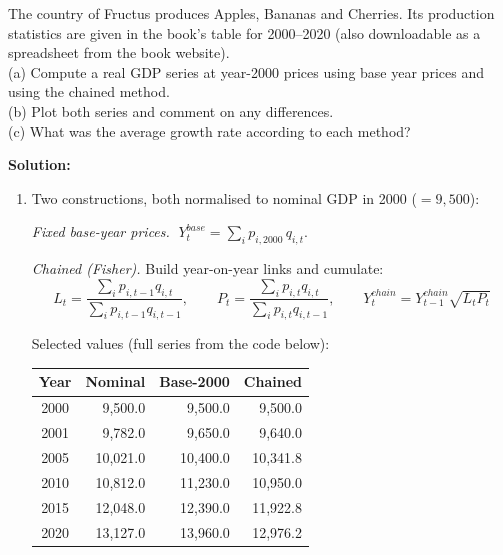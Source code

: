 \documentclass[12pt, letterpaper]{article}
\begin{document}
\begin{tcolorbox}[oddbox,title={Problem 1.3 \quad Chained GDP}]
\begin{tcolorbox}[questionbox]
The country of Fructus produces Apples, Bananas and Cherries. Its production statistics are
given in the book's table for 2000--2020 (also downloadable as a spreadsheet from the book
website).\\[3pt]
(a) Compute a real GDP series at year-2000 prices using base year prices and using the
chained method.\\
(b) Plot both series and comment on any differences.\\
(c) What was the average growth rate according to each method?
\end{tcolorbox}

\textbf{Solution:}

\begin{enumerate}

\item Two constructions, both normalised to nominal GDP in 2000 ($=9{,}500$):

\emph{Fixed base-year prices.} $\;Y^{base}_t = \sum_i p_{i,2000}\, q_{i,t}$.

\emph{Chained (Fisher).} Build year-on-year links and cumulate:
$$L_t = \frac{\sum_i p_{i,t-1}q_{i,t}}{\sum_i p_{i,t-1}q_{i,t-1}}, \qquad
P_t = \frac{\sum_i p_{i,t}q_{i,t}}{\sum_i p_{i,t}q_{i,t-1}}, \qquad
Y^{chain}_t = Y^{chain}_{t-1}\sqrt{L_t P_t}$$

Selected values (full series from the code below):

\begin{center}
\begin{tabular}{crrr}
\toprule
\textbf{Year} & \textbf{Nominal} & \textbf{Base-2000} & \textbf{Chained} \\
\midrule
2000 &  9,500.0 &  9,500.0 &  9,500.0 \\
2001 &  9,782.0 &  9,650.0 &  9,640.0 \\
2005 & 10,021.0 & 10,400.0 & 10,341.8 \\
2010 & 10,812.0 & 11,230.0 & 10,950.0 \\
2015 & 12,048.0 & 12,390.0 & 11,922.8 \\
2020 & 13,127.0 & 13,960.0 & 12,976.2 \\
\bottomrule
\end{tabular}
\end{center}


\end{enumerate}
\end{tcolorbox}
\end{document}
